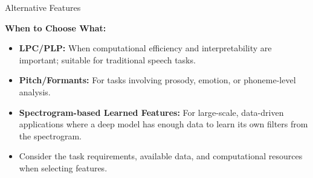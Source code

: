\begin{frame}[allowframebreaks]{Alternative Features}
\framebreak

\textbf{When to Choose What:}
\begin{itemize}
    \item \textbf{LPC/PLP:} When computational efficiency and interpretability are important; suitable for traditional speech tasks.
    \item \textbf{Pitch/Formants:} For tasks involving prosody, emotion, or phoneme-level analysis.
    \item \textbf{Spectrogram-based Learned Features:} For large-scale, data-driven applications where a deep model has enough data to learn its own filters from the spectrogram.
    \item Consider the task requirements, available data, and computational resources when selecting features.
\end{itemize}
\end{frame}